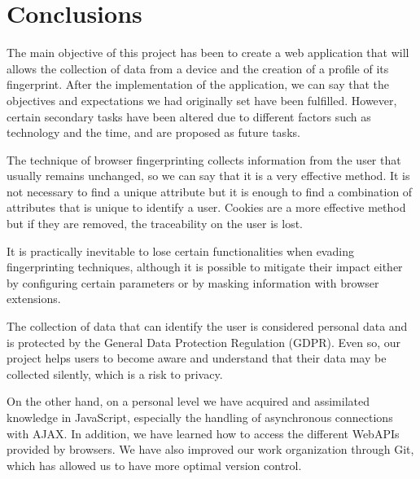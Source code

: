 \chapter{Conclusions}
The main objective of this project has been to create a web application that will allows the collection of data from a device and the creation of a profile of its fingerprint. After the implementation of the application, we can say that the objectives and expectations we had originally set have been fulfilled. However, certain secondary tasks have been altered due to different factors such as technology and the time, and are proposed as future tasks. \par

The technique of browser fingerprinting collects information from the user that usually remains unchanged, so we can say that it is a very effective method. It is not necessary to find a unique attribute but it is enough to find a combination of attributes that is unique to identify a user. Cookies are a more effective method but if they are removed, the traceability on the user is lost. \par 

It is practically inevitable to lose certain functionalities when evading fingerprinting techniques, although it is possible to mitigate their impact either by configuring certain parameters or by masking information with browser extensions. \par 

The collection of data that can identify the user is considered personal data and is protected by the General Data Protection Regulation (GDPR). Even so, our project helps users to become aware and understand that their data may be collected silently, which is a risk to privacy. \par

On the other hand, on a personal level we have acquired and assimilated knowledge in JavaScript, especially the handling of asynchronous connections with AJAX. In addition, we have learned how to access the different WebAPIs provided by browsers.
We have also improved our work organization through Git, which has allowed us to have more optimal version control. \par
